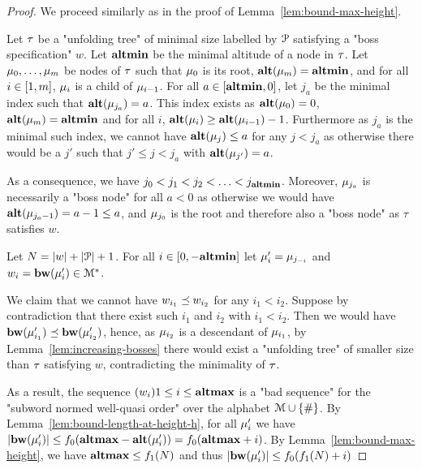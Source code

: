 \lemBoundMinHeight*

\begin{proof}
	We proceed similarly as in the proof of Lemma~\ref{lem:bound-max-height}. 
	
	Let $\tau$ be a "unfolding tree" of minimal size labelled by $\mathcal{P}$ satisfying a "boss specification" $w$. Let $\mathbf{altmin}$ be the minimal altitude of a node in $\tau$. Let $\mu_0, \ldots, \mu_m$ be nodes of $\tau$ such that $\mu_0$ is its root, $\mathbf{alt}(\mu_m) = \mathbf{altmin}$, and for all $i\in [1,m]$, $\mu_i$ is a child of $\mu_{i-1}$.
	For all $a \in [\mathbf{altmin},0]$, let $j_a$ be the minimal index such that $\mathbf{alt}(\mu_{j_a}) = a$. This index exists as $\mathbf{alt}(\mu_0) = 0$, $\mathbf{alt}(\mu_m) = \mathbf{altmin}$ and for all $i$, $\mathbf{alt}(\mu_{i}) \geq \mathbf{alt}(\mu_{i-1})-1$.
	Furthermore as $j_a$ is the minimal such index, we cannot have $\mathbf{alt}(\mu_j) \leq a$ for any $j < j_a$ as otherwise there would be a $j'$ such that $j' \leq j < j_a$ with $\mathbf{alt}(\mu_{j'}) = a$.
	
	As a consequence, we have $j_0 < j_1 < j_2 < \ldots < j_{\mathbf{altmin}}$. Moreover, $\mu_{j_a}$ is necessarily a "boss node" for all $a<0$ as otherwise we would have $\mathbf{alt}(\mu_{j_a-1}) = a-1 \leq a$, and $\mu_{j_0}$ is the root and therefore also a "boss node" as $\tau$ satisfies $w$.
	
	Let $N = |w| + |\mathcal{P}|+1$. For all $i \in [0,-\mathbf{altmin}]$ let $\mu'_i = \mu_{j_{-i}}$ and $w_i = \mathbf{bw}(\mu'_{i}) \in \mathcal{M}^*$.
	
	We claim that we cannot have $w_{i_1}\preceq w_{i_2}$ for any  $i_1< i_2$.
	Suppose by contradiction that there exist such $i_1$ and $i_2$ with $i_1 < i_2$. Then we would have $\mathbf{bw}(\mu'_{i_1}) \preceq \mathbf{bw}(\mu'_{i_2})$, hence, as $\mu_{i_2}$ is a descendant of $\mu_{i_1}$, by Lemma~\ref{lem:increasing-bosses} there would exist a "unfolding tree" of smaller size than $\tau$ satisfying $w$, contradicting the minimality of $\tau$.
	
	As a result, the sequence $(w_i){1\leq i \leq \mathbf{altmax}}$ is a "bad sequence" for the "subword normed well-quasi order" over the alphabet $\mathcal{M}\cup\{\#\}$.
	By Lemma~\ref{lem:bound-length-at-height-h}, for all $\mu'_i$ we have $|\mathbf{bw}(\mu'_i)| \leq f_0(\mathbf{altmax} - \mathbf{alt}(\mu'_i)) = f_0(\mathbf{altmax} +i)$.
	By Lemma~\ref{lem:bound-max-height}, we have $\mathbf{altmax} \leq f_1(N)$ and thus $|\mathbf{bw}(\mu'_i)| \leq  f_0(f_1(N) +i)$
	

\end{proof}

